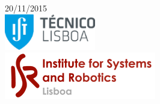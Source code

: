 \begin{titlepage}


{\large 20/11/2015}\\[2cm] %


\includegraphics{ist-logo.png}\\[0.5cm] %

\includegraphics{isr-logo.png}\\[0.5cm] %
 

\vfill %

\end{titlepage}

\section{}

